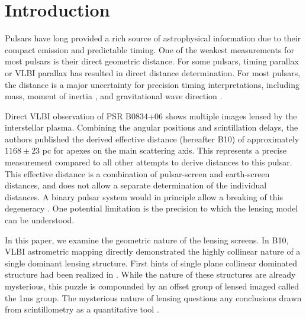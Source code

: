 \documentclass[useAMS,usenatbib]{mn2e}
\begin{document}
\newcommand{\be}{\begin{eqnarray}}
\newcommand{\ee}{\end{eqnarray}}
\newcommand{\beq}{\begin{equation}}
\newcommand{\eeq}{\end{equation}}

\section{Introduction}

Pulsars have long provided a rich source of astrophysical information
due to their compact emission and predictable timing. One of the
weakest measurements for most pulsars is their direct geometric
distance.  For some pulsars, timing parallax or VLBI parallax has
resulted in direct distance determination.  For most pulsars, the
distance is a major uncertainty for precision timing interpretations,
including mass, moment of inertia \citep{2006Sci...314...97K,2012hpa..book.....L}, and
gravitational wave direction \citep{boyle2012}.

Direct VLBI observation of PSR B0834+06 shows multiple images lensed
by the interstellar plasma.  Combining the angular positions and
scintillation delays, the authors published the derived effective
distance \citep{2010ApJ...708..232B} (hereafter B10) of approximately $1168\pm 23$ pc
for apexes on the main scattering axis.
This represents a precise
measurement compared to all other attempts to derive distances to this
pulsar.  This effective distance is a combination of pulsar-screen and
earth-screen distances, and does not allow a separate determination of
the individual distances.  A binary pulsar system would in principle
allow a breaking of this degeneracy \citep{2014MNRAS.442.3338P}. One
potential limitation is the precision to which the lensing model can
be understood.  

In this paper, we examine the geometric nature of the lensing screens.
In B10, VLBI astrometric mapping directly demonstrated the highly
collinear nature of a single dominant lensing structure.  First hints
of single plane collinear dominated structure had been realized in
\citet{2001ApJ...549L..97S}.   While the nature of these structures
are already mysterious, this puzzle is compounded by an offset group
of lensed imaged called the 1ms group.  The mysterious nature of
lensing questions any conclusions drawn from scintillometry as a
quantitative tool \citep{2014MNRAS.440L..36P}.
\end{document}
